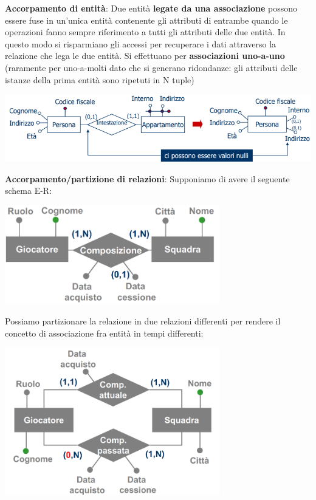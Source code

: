 \documentclass[12pt]{article}
\begin{document}
\textbf{Accorpamento di entità}: Due entità \textbf{legate da una associazione} possono essere fuse in un'unica entità contenente gli attributi di entrambe quando le operazioni fanno sempre riferimento a tutti gli attributi delle due entità.
In questo modo si risparmiano gli accessi per recuperare i dati attraverso la relazione che lega le due entità.
Si effettuano per \textbf{associazioni uno-a-uno} (raramente per uno-a-molti dato che si generano ridondanze: gli attributi delle istanze della prima entità sono ripetuti in N tuple)
\begin{center}
    \includegraphics[width = 1\textwidth]{Images/107.PNG}
\end{center}
\textbf{Accorpamento/partizione di relazioni}: Supponiamo di avere il seguente schema E-R:
\begin{center}
    \includegraphics[width = 0.70\textwidth]{Images/108.PNG}
\end{center}
\newpage
\noindent
Possiamo partizionare la relazione in due relazioni differenti per rendere il concetto di associazione fra entità in tempi differenti:
\begin{center}
    \includegraphics[width = 0.70\textwidth]{Images/109.PNG}
\end{center}
\end{document}
